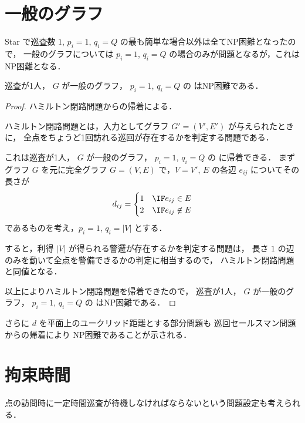 \section{一般のグラフ}
Star で巡査数 $1$, $p_i = 1$, $q_i = Q$ の最も簡単な場合以外は全てNP困難となったので，
一般のグラフについては $p_i = 1$, $q_i = Q$ の場合のみが問題となるが，これはNP困難となる．

\begin{theo}
	巡査が1人， $G$ が一般のグラフ， $p_i = 1$, $q_i = Q$ の \maxprofit はNP困難である．
\end{theo}
\begin{proof}
ハミルトン閉路問題からの帰着による．

ハミルトン閉路問題とは，入力としてグラフ $G' = (V',E')$ が与えられたときに，
全点をちょうど1回訪れる巡回が存在するかを判定する問題である．

これは巡査が1人， $G$ が一般のグラフ， $p_i = 1$, $q_i = Q$ の \maxprofit に帰着できる．
まずグラフ $G$ を元に完全グラフ $G = (V,E)$ で，$V = V'$, 
$E$ の各辺 $e_{ij}$ についてその長さが
\begin{equation}
d_{ij} =
\begin{cases}
	1 & \IF e_{ij} \in E \\
	2 & \IF e_{ij} \not\in E
\end{cases}
\end{equation}
であるものを考え，$p_i = 1$, $q_i = |V|$ とする．

すると，利得 $|V|$ が得られる警邏が存在するかを判定する問題は，
長さ $1$ の辺のみを動いて全点を警備できるかの判定に相当するので，
ハミルトン閉路問題と同値となる．

以上によりハミルトン閉路問題を帰着できたので，
巡査が1人， $G$ が一般のグラフ， $p_i = 1$, $q_i = Q$ の \maxprofit はNP困難である．
\end{proof}

さらに $d$ を平面上のユークリッド距離とする部分問題も
巡回セールスマン問題からの帰着により NP困難であることが示される．






\section{拘束時間}
点の訪問時に一定時間巡査が待機しなければならないという問題設定も考えられる．

